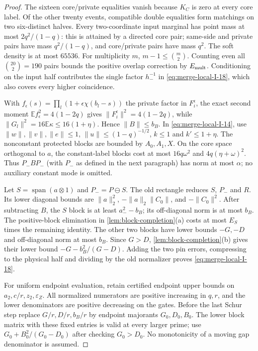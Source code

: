 \begin{proof}
The sixteen core/private equalities vanish because $K_C$ is zero
at every core label. Of the other twenty events, compatible
double equalities form matchings on two six-distinct halves.
Every two-coordinate input marginal has point mass at most
$2q^2/(1-q)$: this is attained by a directed core pair; same-side
and private pairs have mass $q^2/(1-q)$, and core/private pairs
have mass $q^2$. The soft density is at most $65536$.
For multiplicity $m$, $m-1\le\binom m2$. Counting even all
$\binom{20}{2}=190$ pairs bounds the positive overlap correction
by $E_{\rm mult}$. Conditioning on the input half contributes the single factor
$h_-^{-1}$ in \eqref{eq:merge-local-I-18}, which also covers every higher coincidence.

With $f_\epsilon(s)=\prod_l(1+\epsilon\chi(b_l-s))$ the
private factor in $F_i^\epsilon$, the exact second moment
$\mathbb E f_\epsilon^2=4(1-2q)$ gives
$\|F_i^\epsilon\|^2=4(1-2q)$, while
$\|G_l\|^2=16\mathbb E\kappa\le16(1+\eta)$.
Hence $\|B\|\le b_B$. In \eqref{eq:merge-local-I-14}, use
$\|w\|,\|v\|,\|e\|\le1$, $\|u\|\le(1-q)^{-1/2}$,
$k\le1$ and $k'\le1+\eta$. The nonconstant protected blocks
are bounded by $A_0,A_1,X$. On the core space orthogonal to
$a$, the constant-label blocks cost at most $16q\omega^2$
and $4q(\eta+\omega)^2$. Thus $P_-BP_-$ (with $P_-$ as defined in the next paragraph) has norm at most
$\alpha$; no auxiliary constant mode is omitted.

Let $S=\operatorname{span}(a\otimes1)$ and $P_-=P\ominus S$.
The old rectangle reduces $S$, $P_-$ and $R$. Its lower diagonal bounds are
$\|a\|_2^2$, $-\|a\|_2\|C_0\|$, and $-\|C_0\|^2$.
After subtracting $B$, the $S$ block is at least $a_-^2-b_B$;
its off-diagonal norm is at most $b_B$. The positive-block elimination in \cref{lem:block-completion}(a)
costs at most $E_S$ times the remaining identity. The other
two blocks have lower bounds $-G,-D$ and off-diagonal norm
at most $b_B$. Since $G>D$, \cref{lem:block-completion}(b) gives their lower bound
$-G-b_B^2/(G-D)$. Adding the two pin errors, compressing to
the physical half and dividing by the old normalizer proves
\eqref{eq:merge-local-I-18}.

For uniform endpoint evaluation, retain certified endpoint
upper bounds on $a_2,c/r,z_2,\varepsilon_Z$. All normalized
numerators are positive increasing in $q,r$, and the lower
denominators are positive decreasing on the gates. Before the
last Schur step replace $G/r,D/r,b_B/r$ by endpoint majorants
$G_0,D_0,B_0$. The lower block matrix with these fixed entries
is valid at every larger prime; use
$G_0+B_0^2/(G_0-D_0)$ after checking $G_0>D_0$.
No monotonicity of a moving gap denominator is assumed.
\end{proof}

